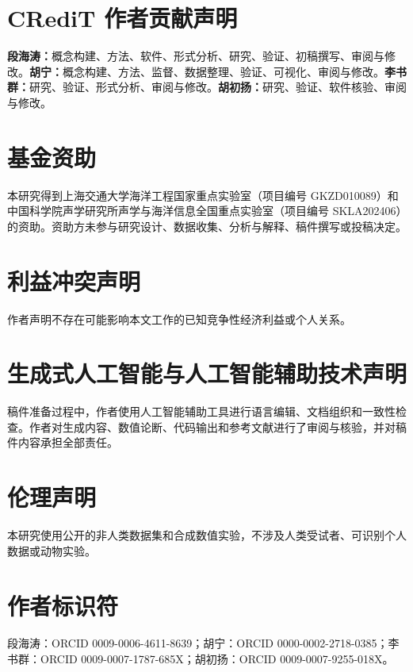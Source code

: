 \documentclass[UTF8,11pt]{ctexart}
\begin{document}
\section*{CRediT 作者贡献声明}
\textbf{段海涛：}概念构建、方法、软件、形式分析、研究、验证、初稿撰写、审阅与修改。\textbf{胡宁：}概念构建、方法、监督、数据整理、验证、可视化、审阅与修改。\textbf{李书群：}研究、验证、形式分析、审阅与修改。\textbf{胡初扬：}研究、验证、软件核验、审阅与修改。

\section*{基金资助}
本研究得到上海交通大学海洋工程国家重点实验室（项目编号 GKZD010089）和中国科学院声学研究所声学与海洋信息全国重点实验室（项目编号 SKLA202406）的资助。资助方未参与研究设计、数据收集、分析与解释、稿件撰写或投稿决定。

\section*{利益冲突声明}
作者声明不存在可能影响本文工作的已知竞争性经济利益或个人关系。

\section*{生成式人工智能与人工智能辅助技术声明}
稿件准备过程中，作者使用人工智能辅助工具进行语言编辑、文档组织和一致性检查。作者对生成内容、数值论断、代码输出和参考文献进行了审阅与核验，并对稿件内容承担全部责任。

\section*{伦理声明}
本研究使用公开的非人类数据集和合成数值实验，不涉及人类受试者、可识别个人数据或动物实验。

\section*{作者标识符}
段海涛：ORCID 0009-0006-4611-8639；胡宁：ORCID 0000-0002-2718-0385；李书群：ORCID 0009-0007-1787-685X；胡初扬：ORCID 0009-0007-9255-018X。



\end{document}
